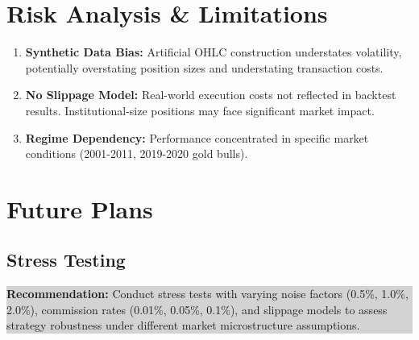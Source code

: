 \documentclass[11pt,a4paper]{article}
\begin{document}
\section{Risk Analysis \& Limitations}

\begin{enumerate}
\item \textbf{Synthetic Data Bias:} Artificial OHLC construction understates volatility, potentially overstating position sizes and understating transaction costs.

\item \textbf{No Slippage Model:} Real-world execution costs not reflected in backtest results. Institutional-size positions may face significant market impact.

\item \textbf{Regime Dependency:} Performance concentrated in specific market conditions (2001-2011, 2019-2020 gold bulls).
\end{enumerate}

\section{Future Plans}

\subsection{Stress Testing}
\colorbox{lightgray}{\parbox{\textwidth}{
\textbf{Recommendation:} Conduct stress tests with varying noise factors (0.5\%, 1.0\%, 2.0\%), commission rates (0.01\%, 0.05\%, 0.1\%), and slippage models to assess strategy robustness under different market microstructure assumptions.
}}
\end{document}
